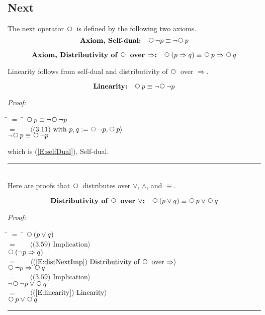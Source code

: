 \documentclass[fleqn, leqno]{article}
\newcommand{\lgap}{2pt} %
\newcommand{\mymathindent}{24pt} %
\newcommand{\impl}{\ensuremath{\Rightarrow}} %
\newcommand{\Next}{\;\,\text{\raisebox{3.5pt}{\circle{6}}}}
\newcommand{\myqed}{\hfill\rule[-.23ex]{1.2ex}{2.0ex}}
\newcommand{\spacer}{\vspace{-30pt}}
\newcommand{\Gll} {\langle} %
\newcommand{\Ggg} {\rangle} %
\newcommand{\Hint}[1] {\ \ \ $\Gll \mbox{#1} \Ggg$ } %
\begin{document}
\subsection{Next}

The next operator $\Next$ is defined by the following two axioms.
\begin{equation}\label{E:selfDual}
\textbf{Axiom, Self-dual:}\quad \Next\lnot p \equiv \lnot\Next p
\end{equation}

\spacer

\begin{equation}\label{E:distNextImp}
\textbf{Axiom, Distributivity of $\Next$ over $\Rightarrow$:}\quad \Next (p \Rightarrow q) \equiv \Next p \Rightarrow \Next q
\end{equation}

Linearity follows from self-dual and distributivity of $\Next$ over $\impl$.


\begin{equation}\label{E:linearity}
\textbf{Linearity:}\quad \Next p \equiv \lnot\Next\lnot p
\end{equation}

\emph{Proof:}
\begin{tabbing}
\hspace{\mymathindent} \= $= \;$ \= \kill
\> \> $\Next p \equiv \lnot\Next\lnot p$\\[\lgap]
\> $=$ \> \Hint{(3.11) with $p,q := \Next\lnot p, \Next p$} \\[\lgap]
\> \> $\lnot\Next p \equiv \Next\lnot p$
\end{tabbing}
which is (\ref{E:selfDual}), Self-dual. \myqed\\[\lgap]

Here are proofs that $\Next$ distributes over $\lor$, $\land$, and $\equiv$.

\begin{equation}\label{E:distNextOr}
\textbf{Distributivity of $\Next$ over $\lor$:}\quad \Next (p \lor q) \equiv \Next p \lor \Next q
\end{equation}

\emph{Proof:}
\begin{tabbing}
\hspace{\mymathindent} \= $= \;$ \= \kill
\> \> $\Next(p \lor q)$\\[\lgap]
\> $=$ \> \Hint{(3.59) Implication}\\[\lgap]
\> \> $\Next(\lnot p \Rightarrow q)$\\[\lgap]
\> $=$ \> \Hint{(\ref{E:distNextImp}) Distributivity of $\Next$ over $\Rightarrow$}\\[\lgap]
\> \> $\Next\lnot p \Rightarrow \Next q$\\[\lgap]
\> $=$ \> \Hint{(3.59) Implication}\\[\lgap]
\> \> $\lnot\Next\lnot p \lor \Next q$\\[\lgap]
\> $=$ \> \Hint{(\ref{E:linearity}) Linearity}\\[\lgap]
\> \> $\Next p \lor \Next q$
\end{tabbing}
\myqed\\[\lgap]
\end{document}
